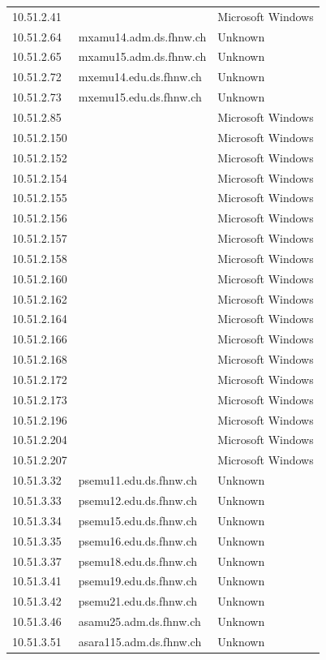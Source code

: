 \documentclass[a4paper,11pt]{scrartcl}
\begin{document}
\begin{longtable}{p{2.5cm}|p{8cm}|l}
	10.51.2.41 &  & Microsoft Windows\\
	10.51.2.64 & mxamu14.adm.ds.fhnw.ch & Unknown\\
	10.51.2.65 & mxamu15.adm.ds.fhnw.ch & Unknown\\
	10.51.2.72 & mxemu14.edu.ds.fhnw.ch & Unknown\\
	10.51.2.73 & mxemu15.edu.ds.fhnw.ch & Unknown\\
	10.51.2.85 &  & Microsoft Windows\\
	10.51.2.150 &  & Microsoft Windows\\
	10.51.2.152 &  & Microsoft Windows\\
	10.51.2.154 &  & Microsoft Windows\\
	10.51.2.155 &  & Microsoft Windows\\
	10.51.2.156 &  & Microsoft Windows\\
	10.51.2.157 &  & Microsoft Windows\\
	10.51.2.158 &  & Microsoft Windows\\
	10.51.2.160 &  & Microsoft Windows\\
	10.51.2.162 &  & Microsoft Windows\\
	10.51.2.164 &  & Microsoft Windows\\
	10.51.2.166 &  & Microsoft Windows\\
	10.51.2.168 &  & Microsoft Windows\\
	10.51.2.172 &  & Microsoft Windows\\
	10.51.2.173 &  & Microsoft Windows\\
	10.51.2.196 &  & Microsoft Windows\\
	10.51.2.204 &  & Microsoft Windows\\
	10.51.2.207 &  & Microsoft Windows\\
	10.51.3.32 & psemu11.edu.ds.fhnw.ch & Unknown\\
	10.51.3.33 & psemu12.edu.ds.fhnw.ch & Unknown\\
	10.51.3.34 & psemu15.edu.ds.fhnw.ch & Unknown\\
	10.51.3.35 & psemu16.edu.ds.fhnw.ch & Unknown\\
	10.51.3.37 & psemu18.edu.ds.fhnw.ch & Unknown\\
	10.51.3.41 & psemu19.edu.ds.fhnw.ch & Unknown\\
	10.51.3.42 & psemu21.edu.ds.fhnw.ch & Unknown\\
	10.51.3.46 & asamu25.adm.ds.fhnw.ch & Unknown\\
	10.51.3.51 & asara115.adm.ds.fhnw.ch & Unknown\\

\end{longtable}
\end{document}

